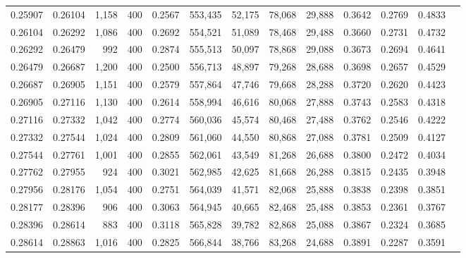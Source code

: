 \begin{tabular}{rrrrrrrrrrrrr}
0.25907 & 0.26104 &  1,158 & 400 &                                     0.2567 & 553,435 &  52,175 &  78,068 &  29,888 & 0.3642 & 0.2769 & 0.4833 \\
0.26104 & 0.26292 &  1,086 & 400 &                                     0.2692 & 554,521 &  51,089 &  78,468 &  29,488 & 0.3660 & 0.2731 & 0.4732 \\
0.26292 & 0.26479 &    992 & 400 &                                     0.2874 & 555,513 &  50,097 &  78,868 &  29,088 & 0.3673 & 0.2694 & 0.4641 \\
0.26479 & 0.26687 &  1,200 & 400 &                                     0.2500 & 556,713 &  48,897 &  79,268 &  28,688 & 0.3698 & 0.2657 & 0.4529 \\
0.26687 & 0.26905 &  1,151 & 400 &                                     0.2579 & 557,864 &  47,746 &  79,668 &  28,288 & 0.3720 & 0.2620 & 0.4423 \\
0.26905 & 0.27116 &  1,130 & 400 &                                     0.2614 & 558,994 &  46,616 &  80,068 &  27,888 & 0.3743 & 0.2583 & 0.4318 \\
0.27116 & 0.27332 &  1,042 & 400 &                                     0.2774 & 560,036 &  45,574 &  80,468 &  27,488 & 0.3762 & 0.2546 & 0.4222 \\
0.27332 & 0.27544 &  1,024 & 400 &                                     0.2809 & 561,060 &  44,550 &  80,868 &  27,088 & 0.3781 & 0.2509 & 0.4127 \\
0.27544 & 0.27761 &  1,001 & 400 &                                     0.2855 & 562,061 &  43,549 &  81,268 &  26,688 & 0.3800 & 0.2472 & 0.4034 \\
0.27762 & 0.27955 &    924 & 400 &                                     0.3021 & 562,985 &  42,625 &  81,668 &  26,288 & 0.3815 & 0.2435 & 0.3948 \\
0.27956 & 0.28176 &  1,054 & 400 &                                     0.2751 & 564,039 &  41,571 &  82,068 &  25,888 & 0.3838 & 0.2398 & 0.3851 \\
0.28177 & 0.28396 &    906 & 400 &                                     0.3063 & 564,945 &  40,665 &  82,468 &  25,488 & 0.3853 & 0.2361 & 0.3767 \\
0.28396 & 0.28614 &    883 & 400 &                                     0.3118 & 565,828 &  39,782 &  82,868 &  25,088 & 0.3867 & 0.2324 & 0.3685 \\
0.28614 & 0.28863 &  1,016 & 400 &                                     0.2825 & 566,844 &  38,766 &  83,268 &  24,688 & 0.3891 & 0.2287 & 0.3591 \\

\end{tabular}
